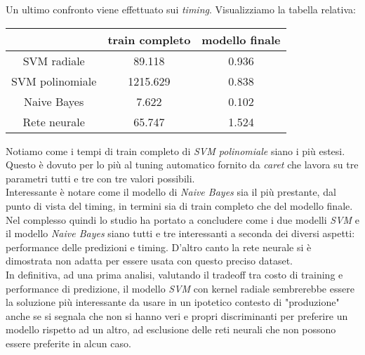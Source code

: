 Un ultimo confronto viene effettuato sui \textit{timing}. Visualizziamo la 
tabella relativa:
\begin{table}[H]
    \centering
    \begin{tabular}{c||c|c}
        & train completo & modello finale\\
        \hline
        \hline
        SVM radiale & 89.118 & 0.936 \\
        SVM polinomiale & 1215.629 & 0.838 \\
        Naive Bayes & 7.622 & 0.102\\
        Rete neurale & 65.747 & 1.524
    \end{tabular}
\end{table}
Notiamo come i tempi di train completo di \textit{SVM polinomiale} siano i più 
estesi. Questo è dovuto per lo più al tuning automatico fornito da 
\textit{caret} che lavora su tre parametri tutti e tre con tre valori 
possibili.\\
Interessante è notare come il modello di \textit{Naive Bayes} sia il più 
prestante, dal punto di vista del timing, in termini sia di train completo che 
del modello finale.\\
Nel complesso quindi lo studio ha portato a concludere come i due modelli 
\textit{SVM} e il modello \textit{Naive Bayes} siano tutti e tre interessanti
a seconda dei diversi aspetti: performance delle predizioni e timing. D'altro
canto la rete neurale si è dimostrata non adatta per essere usata con questo
preciso dataset.\\
In definitiva, ad una prima analisi, valutando il tradeoff tra costo di training
e performance di predizione, il modello \textit{SVM} con kernel radiale 
sembrerebbe essere la soluzione più interessante da usare in un ipotetico
contesto di "produzione" anche se si segnala che non si hanno veri e propri
discriminanti per preferire un modello rispetto ad un altro, ad esclusione delle
reti neurali che non possono essere preferite in alcun caso.